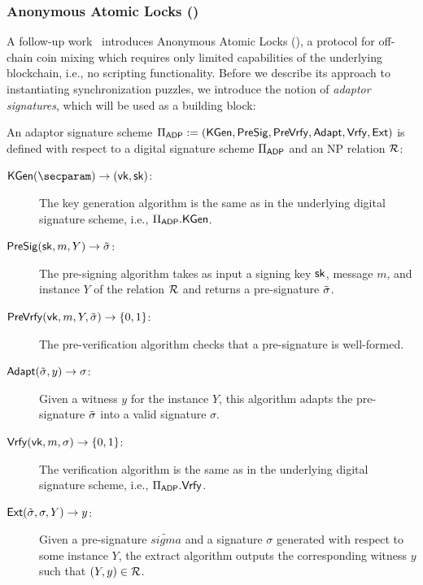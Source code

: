 \subsubsection{Anonymous Atomic Locks (\texorpdfstring{\AAL}{A2L})}

A follow-up work~\cite{SP:TaiMorMaf21} introduces Anonymous Atomic Locks (\AAL), a protocol for off-chain coin mixing which requires only limited capabilities of the underlying blockchain, i.e., no scripting functionality.
Before we describe its approach to instantiating synchronization puzzles, we introduce the notion of \emph{adaptor signatures}, which will be used as a building block:

\begin{definition}
    An adaptor signature scheme $\Pi_{\mathsf{ADP}} := (\mathsf{KGen}, \mathsf{PreSig}, \mathsf{PreVrfy}, \mathsf{Adapt}, \mathsf{Vrfy}, \mathsf{Ext})$ is defined with respect to a digital signature scheme $\Pi_{\mathsf{ADP}}$ and an NP relation $\mathcal{R}$:
    \begin{description}
        \item[$\kgen(\secparam) \to (\vk, \sk)$:] The key generation algorithm is the same as in the underlying digital signature scheme, i.e., $\Pi_{\mathsf{ADP}}.\mathsf{KGen}$.
        \item[$\mathsf{PreSig}(\mathsf{sk}, m, Y) \to \tilde{\sigma}$:] The pre-signing algorithm takes as input a signing key $\mathsf{sk}$, message $m$, and instance $Y$ of the relation $\mathcal{R}$ and returns a pre-signature $\tilde{\sigma}$.
        \item[$\mathsf{PreVrfy}(\mathsf{vk}, m, Y, \tilde{\sigma}) \to \{0, 1\}$:] The pre-verification algorithm checks that a pre-signature is well-formed.
        \item[$\mathsf{Adapt}(\tilde{\sigma}, y) \to \sigma$:] Given a witness $y$ for the instance $Y$, this algorithm adapts the pre-signature $\tilde{\sigma}$ into a valid signature $\sigma$.
        \item[$\mathsf{Vrfy}(\mathsf{vk}, m, \sigma) \to \{0, 1\}$:] The verification algorithm is the same as in the underlying digital signature scheme, i.e., $\Pi_{\mathsf{ADP}}.\mathsf{Vrfy}$.
        \item[$\mathsf{Ext}(\tilde{\sigma}, \sigma, Y) \to y$:] Given a pre-signature $\tilde{sigma}$ and a signature $\sigma$ generated with respect to some instance $Y$, the extract algorithm outputs the corresponding witness $y$ such that $(Y, y) \in \mathcal{R}$.
    \end{description}
\end{definition}

